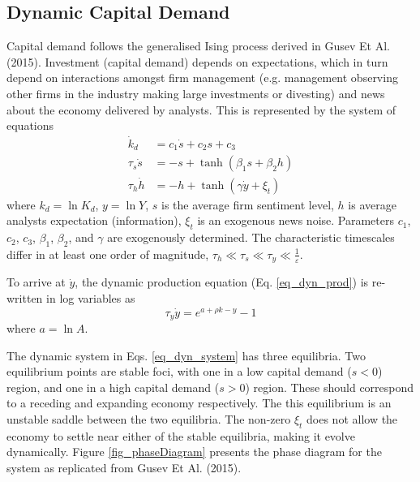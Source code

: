 \documentclass[11pt]{article}
\begin{document}
\subsection{Dynamic Capital Demand}\label{sec_dyn_demand}
Capital demand follows the generalised Ising process derived in Gusev Et Al. (2015). Investment (capital demand) depends on expectations, which in turn depend on interactions amongst firm management (e.g. management observing other firms in the industry making large investments or divesting) and news about the economy delivered by analysts.
This is represented by the system of equations
\begin{subequations}\label{eq_dyn_system}
\begin{align}
\dot{k}_d&=c_1 \dot{s} + c_2 s + c_3 \label{eq_dyn_kd}\\
\tau_s \dot{s}&=-s + \tanh( \beta_1 s + \beta_2 h) \label{eq_sentiment}\\
\tau_h \dot{h}&=-h + \tanh(\gamma \dot{y} + \xi_t)\label{eq_info}
\end{align}
\end{subequations}
where $k_d=\ln{K_d}$, $y=\ln{Y}$, $s$ is the average firm sentiment level, $h$ is average analysts expectation (information), $\xi_t$ is an exogenous news noise. Parameters $c_1$, $c_2$, $c_3$, $\beta_1$, $\beta_2$, and $\gamma$ are exogenously determined. The characteristic timescales differ in at least one order of magnitude, $\tau_h\ll\tau_s\ll\tau_y\ll\frac{1}{\varepsilon}$.

To arrive at $\dot{y}$, the dynamic production equation (Eq. \ref{eq_dyn_prod}) is re-written in log variables as
\begin{equation}\label{eq_dyn_prod_log}
\tau_y\dot{y} = e^{a+\rho k - y} - 1
\end{equation}
where $a = \ln{A}$. 

The dynamic system in Eqs. \eqref{eq_dyn_system} has three equilibria. Two equilibrium points are stable foci, with one in a low capital demand ($s<0$) region, and one in a high capital demand ($s>0$) region. These should correspond to a receding and expanding economy respectively. The this equilibrium is an unstable saddle between the two equilibria. The non-zero $\xi_t$ does not allow the economy to settle near either of the stable equilibria, making it evolve dynamically. Figure \ref{fig_phaseDiagram} presents the phase diagram for the system as replicated from Gusev Et Al. (2015). 
\end{document}
